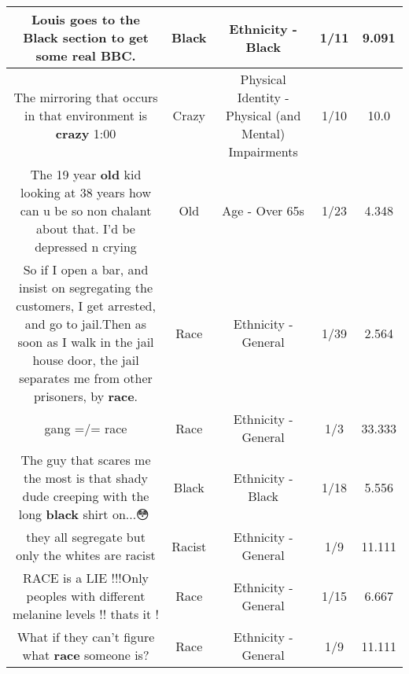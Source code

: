 \documentclass[11pt]{article}
\newlength\mylength
\begin{document}
\begin{center}
\begin{longtable}{|C{.65\mylength}|C{.30\mylength}|C{.12\mylength}|C{.12\mylength}|C{.12\mylength}|}
  \small Louis goes to the \textbf{Black} section to get some real BBC.\normalsize   & Black & Ethnicity - Black & 1/11 & 9.091 \\  \hline
  \small The mirroring that occurs in that environment is \textbf{crazy} 1:00\normalsize   & Crazy & Physical Identity - Physical (and Mental) Impairments & 1/10 & 10.0 \\  \hline
  \small The 19 year \textbf{old} kid looking at 38 years how can u be so non chalant about that. I'd be depressed n crying\normalsize   & Old & Age - Over 65s & 1/23 & 4.348 \\  \hline
  \small So if I open a bar, and insist on segregating the customers, I get arrested, and go to jail.Then as soon as I walk in the jail house door, the jail separates me from other prisoners, by \textbf{race}.\normalsize   & Race & Ethnicity - General & 1/39 & 2.564 \\  \hline
  \small gang =/= race\normalsize   & Race & Ethnicity - General & 1/3 & 33.333 \\  \hline
  \small The guy that scares me the most is that shady dude creeping with the long \textbf{black} shirt on...😳🤨\normalsize   & Black & Ethnicity - Black & 1/18 & 5.556 \\  \hline
  \small they all segregate but only the whites are racist\normalsize   & Racist & Ethnicity - General & 1/9 & 11.111 \\  \hline
  \small RACE is a LIE !!!Only peoples with different melanine levels !! thats it !\normalsize   & Race & Ethnicity - General & 1/15 & 6.667 \\  \hline
  \small What if they can't figure what \textbf{race} someone is?\normalsize   & Race & Ethnicity - General & 1/9 & 11.111 \\  \hline

\end{longtable}
\end{center}
\end{document}
